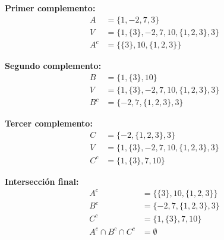 \documentclass{article}
\begin{document}
\begin{enumerate}[label=\roman*)]
    \textbf{Primer complemento:}
    \begin{align*}
        A &= \{1,-2,7,3\}\\
        V &= \{1, \{3\}, -2, 7, 10, \{1,2,3\},3\}\\
        A^{c} &= \{\{3\}, 10, \{1,2,3\}\} 
    \end{align*}
    
    \textbf{Segundo complemento:}
    \begin{align*}
        B &= \{1,\{3\}, 10\}\\
        V &= \{1, \{3\}, -2, 7, 10, \{1,2,3\},3\}\\
        B^{c} &= \{-2, 7, \{1,2,3\}, 3\}
    \end{align*}
    
    \textbf{Tercer complemento:}
    \begin{align*}
        C &= \{-2, \{1,2,3\}, 3\}\\
        V &= \{1, \{3\}, -2, 7, 10, \{1,2,3\}, 3\}\\
        C^{c} &= \{1, \{3\}, 7, 10\}
    \end{align*}

    \textbf{Intersección final:}
    \begin{align*}
        A^{c} &= \{\{3\}, 10, \{1,2,3\}\}\\
        B^{c} &= \{-2, 7, \{1,2,3\}, 3\}\\
        C^{c} &= \{1, \{3\}, 7, 10\}\\
        A^{c} \cap B^{c} \cap C^{c} &= \emptyset
    \end{align*}
\end{enumerate}
\end{document}
